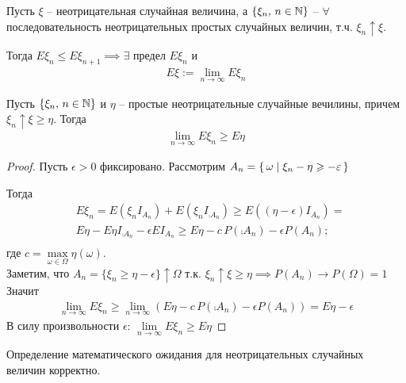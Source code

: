 
\begin{definition}
  Пусть $\xi$ -- неотрицательная случайная величина, 
  а $\{ \xi_n,\, n \in \mathbb{N} \}$ -- $\forall$ последовательность неотрицательных 
  простых случайных величин, т.ч. $\xi_n \uparrow \xi$. 

  Тогда $E \xi_n \leq E \xi_{n + 1} \implies \exists$ предел $E \xi_n$ и
  \begin{align*}
    E \xi := \lim_{n \to \infty} E \xi_n
  \end{align*}
\end{definition}

\begin{lemma}
  Пусть $\{ \xi_n,\, n \in \mathbb{N} \}$ и $\eta$ -- простые неотрицательные случайные вечилины, 
  причем $\xi_n \uparrow \xi \geq \eta$. Тогда 
  \begin{align*}
    \lim_{n \to \infty} E \xi_n \geq E \eta
  \end{align*}
\end{lemma}

\begin{proof}
  Пусть $\epsilon > 0$ фиксировано. 
  Рассмотрим $A_n = \left\{ \, \omega \mid \xi_n - \eta \geqslant -\varepsilon \, \right\}$

  Тогда
  \begin{align*}
    &E\xi_n = E(\xi_n I_{A_n}) + E(\xi_n I_{\comp{A}_n}) \geq E((\eta - \epsilon) I_{A_n}) = \\
    &E \eta - E\eta I_{\comp{A}_n} - \epsilon E I_{A_n} \geq 
    E\eta - c\, P(\comp{A}_n) - \epsilon P(A_n);\\
  \end{align*}
  где $c = \max\limits_{\omega \in \Omega} \eta(\omega)$. \\
  Заметим, что $A_n = \{ \xi_n \geq \eta - \epsilon \} \uparrow \Omega$ 
  т.к. $\xi_n \uparrow \xi \geq \eta \implies P(A_n) \rightarrow P(\Omega) = 1$\\
  Значит
  \begin{align*}
    \lim_{n \to \infty} E\xi_n \geq \lim_{n \to \infty} (E\eta - c\, P(\comp{A}_n) - \epsilon P(A_n)) = E\eta - \epsilon
  \end{align*}
  В силу произвольности $\epsilon$: $\lim\limits_{n \to \infty} E \xi_n \geq E \eta$
\end{proof}

\begin{corollary}
  Определение математического ожидания для неотрицательных случайных величин корректно.
\end{corollary}

